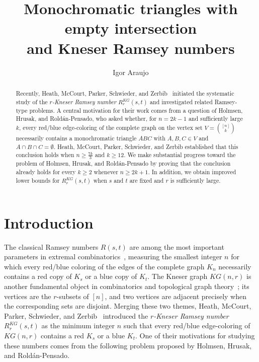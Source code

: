 \documentclass[11pt]{amsart}
\title{Monochromatic triangles with empty intersection \\ 
and Kneser Ramsey numbers }
\author{Igor Araujo}
\date{}
\begin{document}
\begin{abstract}
    Recently, Heath, McCourt, Parker, Schwieder, and Zerbib~\cite{heath} initiated the systematic study of the \emph{$r$-Kneser Ramsey number} $R_r^{KG}(s,t)$ and investigated related Ramsey-type problems.
    A central motivation for their work comes from a question of Holmsen, Hrusak, and Rold\'an-Pensado, who asked whether, for $n=2k-1$ and sufficiently large $k$, every red/blue edge-coloring of the complete graph on the vertex set $V = \binom{[n]}{k}$ necessarily contains a monochromatic triangle $ABC$ with $A,B,C \in V$ and $A \cap B \cap C = \emptyset$. 
    Heath, McCourt, Parker, Schwieder, and Zerbib established that this conclusion holds when $n \ge \frac{7k}{3}$ and $k\ge 12$. 
    We make substantial progress toward the problem of Holmsen, Hrusak, and Rold\'an-Pensado by proving that the conclusion already holds for every $k\ge 2$ whenever $n\ge 2k+1$. In addition, we obtain improved lower bounds for $R_r^{KG}(s,t)$  when $s$ and $t$ are fixed and $r$ is sufficiently large. 
\end{abstract}

\maketitle

\section{Introduction}

The classical Ramsey numbers $R(s,t)$ are among the most important parameters in extremal combinatorics~\cite{graham, ramsey, verstraete}, measuring the smallest integer $n$ for which every red/blue coloring of the edges of the complete graph $K_n$ necessarily contains a red copy of $K_s$ or a blue copy of $K_t$.
The Kneser graph $KG(n,r)$ is another fundamental object in combinatorics and topological graph theory~\cite{alon, kneser, lovasz}; its vertices are the $r$-subsets of $[n]$, and two vertices are adjacent precisely when the corresponding sets are disjoint.
Merging these two themes, Heath, McCourt, Parker, Schwieder, and Zerbib~\cite{heath} introduced the \emph{$r$-Kneser Ramsey number} $R_r^{KG}(s,t)$ as the minimum integer $n$ such that every red/blue edge-coloring of $KG(n,r)$ contains a red $K_s$ or a blue $K_t$. One of their motivations for studying these numbers comes from the following problem proposed by Holmsen, Hrusak, and Rold\'an-Pensado. 
\end{document}
